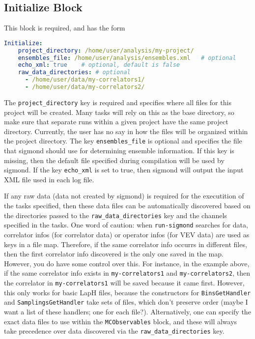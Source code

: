 \documentclass[12pt,letterpaper,notitlepage]{article}
\newcommand{\key}[1]{\textcolor{Emerald}{\texttt{\small{#1}}}}
\newcommand{\runsigmond}{\texttt{run-sigmond}}
\begin{document}
\subsection{Initialize Block}

This block is required, and has the form
\begin{lstlisting}[language=yaml]
  Initialize:
    project_directory: /home/user/analysis/my-project/
    ensembles_file: /home/user/analysis/ensembles.xml   # optional
    echo_xml: true    # optional, default is false
    raw_data_directories: # optional
      - /home/user/data/my-correlators1/
      - /home/user/data/my-correlators2/
\end{lstlisting}
The \key{project\_directory} key is required and specifies where all files for this project will be created.
Many tasks will rely on this as the base directory, so make sure that separate runs within a given project have the same project directory.
Currently, the user has no say in how the files will be organized within the project directory.
The key \key{ensembles\_file} is optional and specifies the file that sigmond should use for determining ensemble information.
If this key is missing, then the default file specified during compilation will be used by sigmond.
If the key \key{echo\_xml} is set to true, then sigmond will output the input XML file used in each log file.

If any raw data (\ie data not created by sigmond) is required for the executition of the tasks specified,
then these data files can be automatically discovered based on the directories passed to the \key{raw\_data\_directories} key and the channels specified in the tasks.
One word of caution: when \runsigmond{} searches for data, correlator infos (for correlator data) or operator infos (for VEV data) are used as keys in a file map.
Therefore, if the same correlator info occurrs in different files, then the first correlator info discovered is the only one saved in the map.
However, you do have some control over this. For instance, in the example above, if the same correlator info exists in \texttt{my-correlators1}
and \texttt{my-correlators2}, then the correlator in \texttt{my-correlators1} will be saved because it came first.
However, this only works for basic LapH files, because the constructors for \texttt{BinsGetHandler} and \texttt{SamplingsGetHandler} take sets of files,
which don't preserve order (maybe I want a list of these handlers; one for each file?).
Alternatively, one can specify the exact data files to use within the \key{MCObservables} block, and these will always take precedence over data discovered via the \key{raw\_data\_directories} key.
\end{document}
